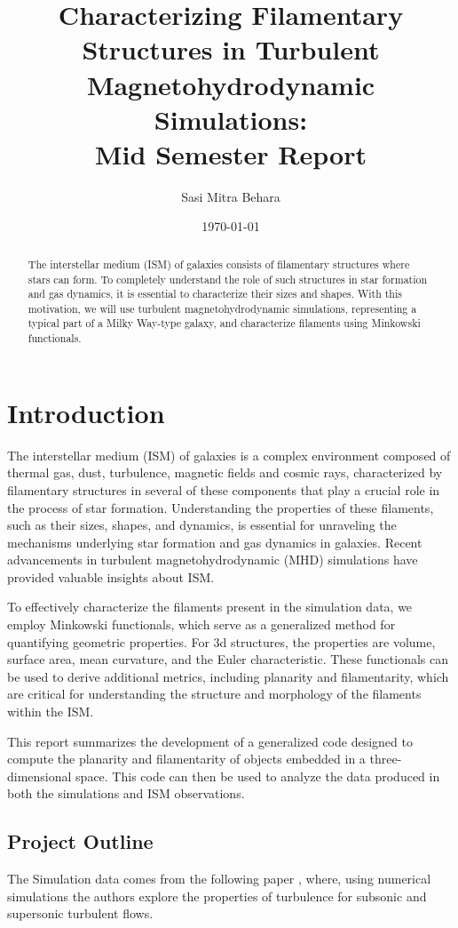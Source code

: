 \documentclass{article}
\title{Characterizing Filamentary Structures in Turbulent Magnetohydrodynamic Simulations: \\
{Mid Semester Report}}
\author{Sasi Mitra Behara}
\date{\today}
\begin{document}
\maketitle

\begin{abstract}
The interstellar medium (ISM) of galaxies consists of filamentary structures where stars can form. To completely understand the role of such structures in star formation and gas dynamics, it is essential to characterize their sizes and shapes. With this motivation, we will use turbulent magnetohydrodynamic simulations, representing a typical part of a Milky Way-type galaxy, and characterize filaments using Minkowski functionals.
\end{abstract}


\section{Introduction}

The interstellar medium (ISM) of galaxies is a complex environment composed of thermal gas, dust, turbulence, magnetic fields and cosmic rays, characterized by filamentary structures in several of these components that play a crucial role in the process of star formation. Understanding the properties of these filaments, such as their sizes, shapes, and dynamics, is essential for unraveling the mechanisms underlying star formation and gas dynamics in galaxies. Recent advancements in turbulent magnetohydrodynamic (MHD) simulations have provided valuable insights about ISM.

To effectively characterize the filaments present in the simulation data, we employ Minkowski functionals, which serve as a generalized method for quantifying geometric properties. For 3d structures, the properties are volume, surface area, mean curvature, and the Euler characteristic. These functionals can be used to derive additional metrics, including planarity and filamentarity, which are critical for understanding the structure and morphology of the filaments within the ISM.

This report summarizes the development of a generalized code designed to compute the planarity and filamentarity of objects embedded in a three-dimensional space. This code can then be used to analyze the data produced in both the simulations and ISM observations.

\subsection{Project Outline}
The Simulation data comes from the following paper \cite{DataPaper}, where, using numerical simulations the authors explore the properties of turbulence for subsonic and supersonic turbulent flows. 
\end{document}

